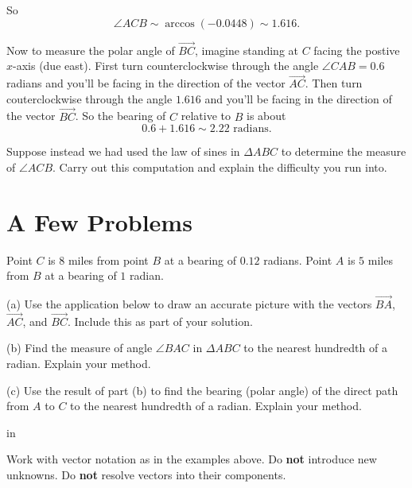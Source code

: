 \documentclass{ximera}
\newcommand{\pskip}{\vskip 0.1 in}
\begin{document}
\begin{example}
\begin{explanation}
So
\[
    \angle ACB \sim \arccos(-0.0448) \sim 1.616 .
\]

Now to measure the polar angle of $\overrightarrow{BC}$, imagine standing at $C$ facing the postive $x$-axis (due east). First turn counterclockwise through the angle $\angle CAB = 0.6$ radians and you'll be facing in the direction of the vector $\overrightarrow{AC}$. Then turn couterclockwise through the angle $1.616$ and you'll be facing in the direction of the vector $\overrightarrow{BC}$. So the bearing of $C$ relative to $B$ is about
\[
    0.6 + 1.616 \sim 2.22 \text{ radians} .
\]

\begin{question}  \label{Qertr452}
Suppose instead we had used the law of sines in $\Delta ABC$ to determine the measure of $\angle ACB$. Carry out this computation and explain the difficulty you run into.
\end{question}

\end{explanation}

\end{example}


\section{A Few Problems}

\begin{question}  \label{QErdsfgt4r}
Point $C$ is $8$ miles from point $B$ at a bearing of $0.12$ radians. Point $A$ is $5$ miles from $B$ at a bearing of $1$ radian.

(a) Use the application below to draw an accurate picture with the vectors $\overrightarrow{BA}$, $\overrightarrow{AC}$, and $\overrightarrow{BC}$. Include this as part of your solution.


 
\begin{onlineOnly}
    \begin{center}
\end{center}
\end{onlineOnly}

(b) Find the measure of angle $\angle BAC$ in $\Delta ABC$ to the nearest hundredth of a radian.  Explain your method.

(c) Use the result of part (b) to find the bearing (polar angle) of the direct path from $A$ to $C$ to the nearest hundredth of a radian. Explain your method.

\pskip

Work with vector notation as in the examples above. Do {\bf not} introduce new unknowns. Do {\bf not} resolve vectors into their components.

\end{question}
\end{document}
